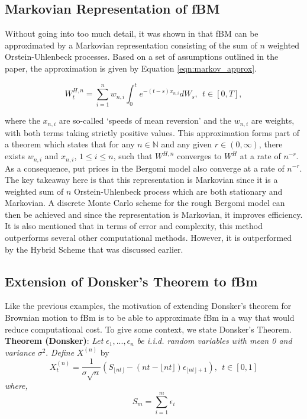 \documentclass[12pt,oneside]{article}
\begin{document}
\subsection{Markovian Representation of fBM}
\label{subsec:markovian_rep_fBm}
Without going into too much detail, it was shown in \cite{Harms2020} that fBM can be approximated by a Markovian representation consisting of the sum of $n$ weighted Orstein-Uhlenbeck processes. Based on a set of assumptions outlined in the paper, the approximation is given by Equation \ref{eqn:markov_approx}.

\begin{equation}
\label{eqn:markov_approx}
W_t^{H,n} = \sum_{i=1}^n w_{n,i} \int_0^t e^{-(t-s)x_{n,i}}dW_s, \ \ t \in [0,T], 
\end{equation}

where the $x_{n,i}$ are so-called `speeds of mean reversion' and the $w_{n,i}$ are weights, with both terms taking strictly positive values. This approximation forms part of a theorem which states that for any $n\in\mathbb{N}$ and any given $r\in(0, \infty)$, there exists $w_{n,i}$ and $x_{n,i}$, $1\le i\le n$, such that $W^{H,n}$ converges to $W^H$ at a rate of $n^{-r}$. As a consequence, put prices in the Bergomi model also converge at a rate of $n^{-r}$. 
\\

The key takeaway here is that this representation is Markovian since it is a weighted sum of $n$ Orstein-Uhlenbeck process which are both stationary and Markovian. A discrete Monte Carlo scheme for the rough Bergomi model can then be achieved and since the representation is Markovian, it improves efficiency. It is also mentioned that in terms of error and complexity, this method outperforms several other computational methods. However, it is outperformed by the Hybrid Scheme that was discussed earlier. 

\subsection{Extension of Donsker's Theorem to fBm}
Like the previous examples, the motivation of extending Donsker's theorem for Brownian motion to fBm is to be able to approximate fBm in a way that would reduce computational cost. To give some context, we state Donsker's Theorem.
\\

 \noindent\textbf{Theorem (Donsker)}: \emph{Let} $\epsilon_1,...,\epsilon_n$ \emph{be i.i.d. random variables with mean 0 and variance} $\sigma^2$. \emph{Define} $X^{(n)}$ {by}
 \begin{equation}
 \label{eq:donsker_thm}
 X_t^{(n)} = \frac{1}{\sigma \sqrt{n}} (S_{\lfloor nt \rfloor} - (nt - \lfloor nt \rfloor) \epsilon_{\lfloor nt \rfloor + 1}), \ \ t\in[0,1]
 \end{equation}
 \emph{where,}
\begin{equation}
S_m = \sum_{i=1}^m \epsilon_i
\end{equation}
\end{document}
